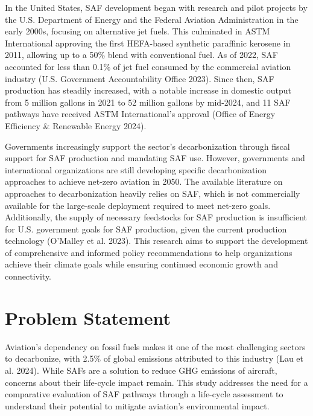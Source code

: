\documentclass[12pt]{article}
\begin{document}
\begin{Appendix}
In the United States, SAF development began with research and pilot projects by the U.S. Department of Energy and the Federal Aviation Administration in the early 2000s, focusing on alternative jet fuels. This culminated in ASTM International approving the first HEFA-based synthetic paraffinic kerosene in 2011, allowing up to a 50\% blend with conventional fuel. As of 2022, SAF accounted for less than 0.1\% of jet fuel consumed by the commercial aviation industry (U.S. Government Accountability Office 2023). Since then, SAF production has steadily increased, with a notable increase in domestic output from 5 million gallons in 2021 to 52 million gallons by mid-2024, and 11 SAF pathways have received ASTM International’s approval (Office of Energy Efficiency \& Renewable Energy 2024). 

Governments increasingly support the sector's decarbonization through fiscal support for SAF production and mandating SAF use. However, governments and international organizations are still developing specific decarbonization approaches to achieve net-zero aviation in 2050. The available literature on approaches to decarbonization heavily relies on SAF, which is not commercially available for the large-scale deployment required to meet net-zero goals. Additionally, the supply of necessary feedstocks for SAF production is insufficient for U.S. government goals for SAF production, given the current production technology (O’Malley et al. 2023). This research aims to support the development of comprehensive and informed policy recommendations to help organizations achieve their climate goals while ensuring continued economic growth and connectivity.


\section{Problem Statement}
Aviation’s dependency on fossil fuels makes it one of the most challenging sectors to decarbonize, with 2.5\% of global emissions attributed to this industry (Lau et al. 2024). While SAFs are a solution to reduce GHG emissions of aircraft, concerns about their life-cycle impact remain. This study addresses the need for a comparative evaluation of SAF pathways through a life-cycle assessment to understand their potential to mitigate aviation’s environmental impact.


\end{Appendix}
\end{document}
